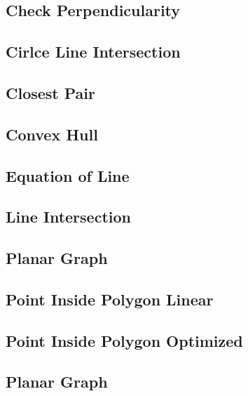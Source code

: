 \subsection{Check Perpendicularity}
\raggedbottom
\hrulefill
\subsection{Cirlce Line Intersection}
\raggedbottom
\hrulefill
\subsection{Closest Pair}
\raggedbottom
\hrulefill
\subsection{Convex Hull}
\raggedbottom
\hrulefill
\subsection{Equation of Line}
\raggedbottom
\hrulefill
\subsection{Line Intersection}
\raggedbottom
\hrulefill
\subsection{Planar Graph}
\raggedbottom
\hrulefill
\subsection{Point Inside Polygon Linear}
\raggedbottom
\hrulefill
\subsection{Point Inside Polygon Optimized}
\raggedbottom
\hrulefill
\subsection{Planar Graph}
\raggedbottom
\hrulefill
